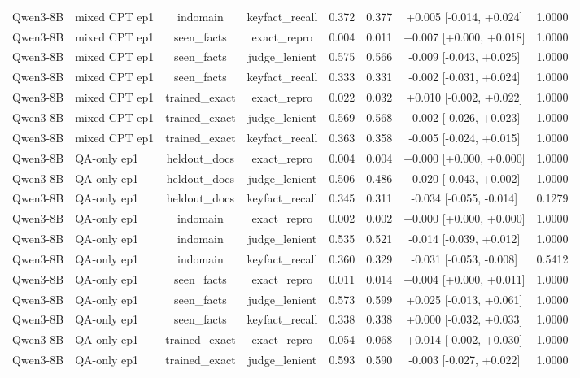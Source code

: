 \begin{table}[t]
{\begin{tabular}{llcccccc}
Qwen3-8B & mixed CPT ep1 & indomain & keyfact\_recall & 0.372 & 0.377 & +0.005 [-0.014, +0.024] & 1.0000 \\
Qwen3-8B & mixed CPT ep1 & seen\_facts & exact\_repro & 0.004 & 0.011 & +0.007 [+0.000, +0.018] & 1.0000 \\
Qwen3-8B & mixed CPT ep1 & seen\_facts & judge\_lenient & 0.575 & 0.566 & -0.009 [-0.043, +0.025] & 1.0000 \\
Qwen3-8B & mixed CPT ep1 & seen\_facts & keyfact\_recall & 0.333 & 0.331 & -0.002 [-0.031, +0.024] & 1.0000 \\
Qwen3-8B & mixed CPT ep1 & trained\_exact & exact\_repro & 0.022 & 0.032 & +0.010 [-0.002, +0.022] & 1.0000 \\
Qwen3-8B & mixed CPT ep1 & trained\_exact & judge\_lenient & 0.569 & 0.568 & -0.002 [-0.026, +0.023] & 1.0000 \\
Qwen3-8B & mixed CPT ep1 & trained\_exact & keyfact\_recall & 0.363 & 0.358 & -0.005 [-0.024, +0.015] & 1.0000 \\
Qwen3-8B & QA-only ep1 & heldout\_docs & exact\_repro & 0.004 & 0.004 & +0.000 [+0.000, +0.000] & 1.0000 \\
Qwen3-8B & QA-only ep1 & heldout\_docs & judge\_lenient & 0.506 & 0.486 & -0.020 [-0.043, +0.002] & 1.0000 \\
Qwen3-8B & QA-only ep1 & heldout\_docs & keyfact\_recall & 0.345 & 0.311 & -0.034 [-0.055, -0.014] & 0.1279 \\
Qwen3-8B & QA-only ep1 & indomain & exact\_repro & 0.002 & 0.002 & +0.000 [+0.000, +0.000] & 1.0000 \\
Qwen3-8B & QA-only ep1 & indomain & judge\_lenient & 0.535 & 0.521 & -0.014 [-0.039, +0.012] & 1.0000 \\
Qwen3-8B & QA-only ep1 & indomain & keyfact\_recall & 0.360 & 0.329 & -0.031 [-0.053, -0.008] & 0.5412 \\
Qwen3-8B & QA-only ep1 & seen\_facts & exact\_repro & 0.011 & 0.014 & +0.004 [+0.000, +0.011] & 1.0000 \\
Qwen3-8B & QA-only ep1 & seen\_facts & judge\_lenient & 0.573 & 0.599 & +0.025 [-0.013, +0.061] & 1.0000 \\
Qwen3-8B & QA-only ep1 & seen\_facts & keyfact\_recall & 0.338 & 0.338 & +0.000 [-0.032, +0.033] & 1.0000 \\
Qwen3-8B & QA-only ep1 & trained\_exact & exact\_repro & 0.054 & 0.068 & +0.014 [-0.002, +0.030] & 1.0000 \\
Qwen3-8B & QA-only ep1 & trained\_exact & judge\_lenient & 0.593 & 0.590 & -0.003 [-0.027, +0.022] & 1.0000 \\

\end{tabular}}
\end{table}
